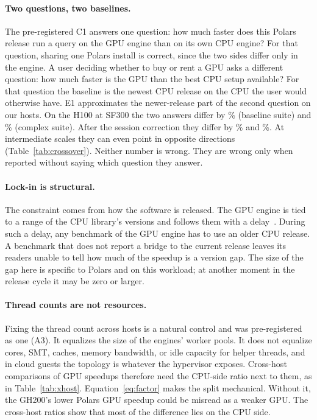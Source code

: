 \documentclass[11pt]{article}
\begin{document}
\paragraph{Two questions, two baselines.} The pre-registered C1 answers one
question: how much faster does this Polars release run a query on the GPU
engine than on its own CPU engine? For that question, sharing one Polars install
is correct, since the two sides differ only in the engine. A user deciding
whether to buy or rent a GPU asks a different question: how much faster is the
GPU than the best CPU setup available? For that question the baseline is the
newest CPU release on the CPU the user would otherwise have. E1 approximates
the newer-release part of the second question on our hosts. On the H100 at
SF300 the two answers differ by \% (baseline
suite) and \% (complex suite). After the
session correction they differ by \% and
\%. At intermediate
scales they can even point in opposite directions
(Table~\ref{tab:crossover}). Neither number is wrong.
They are wrong only when reported without saying which question they answer.

\paragraph{Lock-in is structural.} The constraint comes from how the software
is released. The GPU engine is tied to a range of the CPU library's versions
and follows them with a delay~\citep{pypi_cudfpolars_26102,pypi_polars}. During
such a delay, any benchmark of the GPU engine has to use an older CPU release.
A benchmark that does not report a bridge to the current release leaves its
readers unable to tell how much of the speedup is a version gap. The size of
the gap here is specific to Polars \polarsold{} and \polarsnew{} on this
workload; at another moment in the release cycle it may be zero or larger.

\paragraph{Thread counts are not resources.} Fixing the thread count across
hosts is a natural control and was pre-registered as one (A3). It equalizes the
size of the engines' worker pools. It does not equalize cores, SMT, caches,
memory bandwidth, or idle capacity for helper threads, and in cloud guests the
topology is whatever the hypervisor exposes. Cross-host comparisons of GPU
speedups therefore need the CPU-side ratio next to them, as in
Table~\ref{tab:xhost}. Equation~\eqref{eq:factor} makes the split mechanical.
Without it, the GH200's lower Polars GPU speedup could be misread as a weaker
GPU. The cross-host ratios show that most of the difference lies on the CPU
side.
\end{document}
